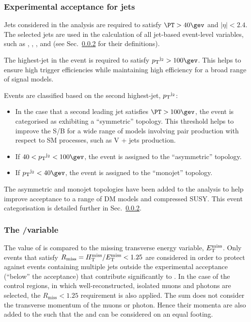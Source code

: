 \subsubsection{Experimental acceptance for jets}

Jets considered in the analysis are required to satisfy $\PT > 40\gev$
and $|\eta| < 2.4$. The selected jets are used in the calculation of
all jet-based event-level variables, such as \njet, \HT, \mht, and
\alphat (see Sec.~\ref{} for their definitions).

The highest-\Pt jet in the event is required to satisfy $\Pt^{\mathrm
  j_2} > 100\gev$. This helps to ensure high trigger efficiencies
while maintaining high efficiency for a broad range of signal models.

Events are classified based on the second highest-\Pt jet,
${p_{\text T}}^{\mathrm j_2}$:
\begin{itemize}
\item In the case that a second leading jet satisfies $\PT > 100\gev$,
  the event is categorised as exhibiting a ``symmetric''
  topology. This threshold helps to improve the S/B for a wide range
  of models involving pair production with respect to SM processes,
  such as V + jets production.
\item If $40 < \Pt^{\mathrm j_2} < 100\gev$, the event is assigned to
  the ``asymmetric'' topology.
\item If $\Pt^{\mathrm j_2} < 40\gev$, the event is assigned to the
  ``monojet'' topology.
\end{itemize}

The asymmetric and monojet topologies have been added to the analysis
to help improve acceptance to a range of DM models and compressed
SUSY. This event categorisation is detailed further in Sec.~\ref{}.

\subsubsection{The \mht/\met variable} 

The value of \mht is compared to the missing transverse energy
variable, $\mbox{$E_\text{T}^{\rm miss}$}$. Only events that satisfy
$R_{\mathrm{miss}}=\mbox{$H_{\rm T}^{\rm miss}$}/\mbox{$E_\text{T}^{\rm miss}$} < 1.25$ are considered in order to
protect against events containing multiple jets outside the
experimental acceptance (\eg ``below'' the \Pt acceptance) that
contribute significantly to \mht. In the case of the control regions,
in which well-reconstructed, isolated muons and photons are selected,
the $R_{\mathrm{miss}} < 1.25$ requirement is also applied. The \mht
sum does not consider the transverse momentum of the muons or
photon. Hence their momenta are also added to the \met such that the
\mht and \met can be considered on an equal footing.


